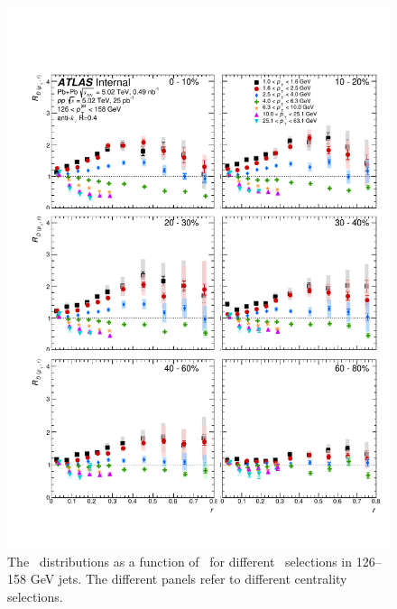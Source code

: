 \begin{figure}[h]
\includegraphics[width=1.0\textwidth]{figures/results/RDpT_dR_jet7.pdf}
\caption{The \RDptr\ distributions as a function of \rvar\ for different \pt\ selections in 126--158 GeV jets. The different panels refer to different centrality selections.}
\label{fig:fullset_rptr_j7}
\end{figure}

